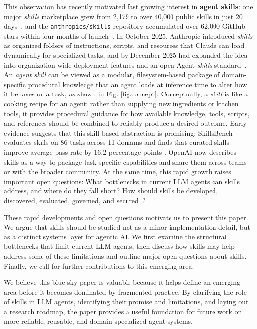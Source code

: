 \documentclass[sigconf,nonacm]{acmart}
\begin{document}
This observation has recently motivated fast growing interest in \textbf{agent skills}: one major \emph{skills} marketplace grew from 2{,}179 to over 40{,}000 public skills in just 20 days~\cite{ling2026skillsanalysis}, and the \texttt{anthropics/skills} repository accumulated over 62{,}000 GitHub stars within four months of launch~\cite{xuyan2026survey}. In October 2025,  Anthropic introduced \emph{skills} as organized folders of instructions, scripts, and resources that Claude can load dynamically for specialized tasks, and by December 2025 had expanded the idea into organization-wide deployment features and an open Agent \emph{skills} standard~\cite{xuyan2026survey}.
An \emph{agent skill} can be viewed as a modular, filesystem-based package of domain-specific procedural knowledge that an agent loads at inference time to alter how it behaves on a task, as shown in Fig. \ref{fig:concept}. Conceptually, a \emph{skill} is like a cooking recipe for an agent: rather than supplying new ingredients or kitchen tools, it provides procedural guidance for how available knowledge, tools, scripts, and references should be combined to reliably produce a desired outcome.
Early evidence suggests that this skill-based abstraction is promising: SkillsBench evaluates skills on 86 tasks across 11 domains and finds that curated skills improve average pass rate by 16.2 percentage points \cite{skillsbench2026}. 
OpenAI now describes skills as a way to package task-specific capabilities and share them across teams or with the broader community. 
At the same time, this rapid growth raises important open questions:  
What bottlenecks in current LLM agents can skills address, and where do they fall short? 
How should skills be developed, discovered, evaluated, governed, and secured~\cite{xuyan2026survey, jiang2026sok}?

These rapid developments and open questions motivate us to present this paper.   
We argue that skills should be studied not as a minor implementation detail, but as a distinct systems layer for agentic AI. We first examine the structural bottlenecks that limit current LLM agents,  then discuss how skills may help address some of these limitations and outline  major open questions about skills. Finally, we call for further contributions  to this emerging area.

We believe this blue-sky paper is valuable because it helps define an emerging area before it becomes dominated by fragmented practice. By clarifying the role of skills in LLM agents, identifying their promise and limitations, and laying out a research roadmap, the paper provides a useful foundation for future work on more reliable, reusable, and domain-specialized agent systems.
\end{document}
